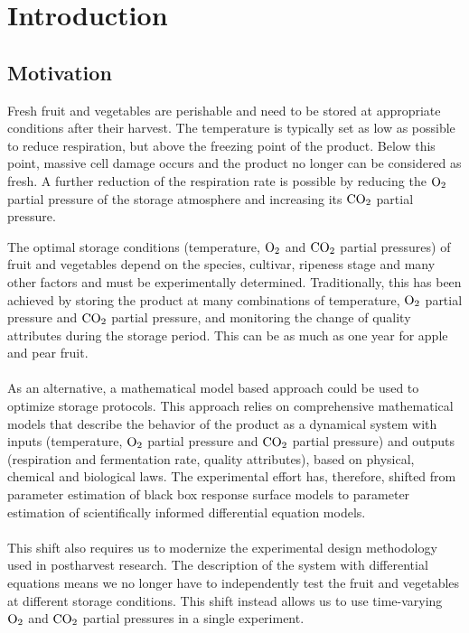 \chapter{Introduction}
\section{Motivation}
Fresh fruit and vegetables are perishable and need to be stored at appropriate conditions after their harvest. The temperature is typically set as low as possible to reduce respiration, but above the freezing point of the product. Below this point, massive cell damage occurs and the product no longer can be considered as fresh. A further reduction of the respiration rate is possible by reducing the $\text{O}_2$ partial pressure of the storage atmosphere and increasing its $\text{CO}_2$
partial pressure. 

The optimal storage conditions (temperature, $\text{O}_2$ and $\text{CO}_2$ partial pressures) of fruit and vegetables depend on the species, cultivar, ripeness stage and many other factors and must be experimentally determined. Traditionally, this has been achieved by storing the product at many combinations of temperature, $\text{O}_2$ partial pressure and $\text{CO}_2$ partial pressure, and monitoring the change of quality attributes during the storage period. This can be as much as one year for apple and pear fruit.
\\
\\
As an alternative, a mathematical model based approach could be used to optimize storage protocols. This approach relies on comprehensive mathematical models that describe the behavior of the product as a dynamical system with inputs (temperature, $\text{O}_2$ partial pressure and $\text{CO}_2$  partial pressure) and outputs (respiration and fermentation rate, quality attributes), based on physical, chemical and biological laws. The experimental effort has, therefore, shifted from parameter estimation of black box response surface models to parameter estimation of scientifically informed differential equation models.
\\
\\
This shift also requires us to modernize the experimental design methodology used in postharvest research. The description of the system with differential equations means we no longer have to independently test the fruit and vegetables at different storage conditions. This shift instead allows us to use time-varying $\text{O}_2$ and $\text{CO}_2$ partial pressures in a single experiment. 
